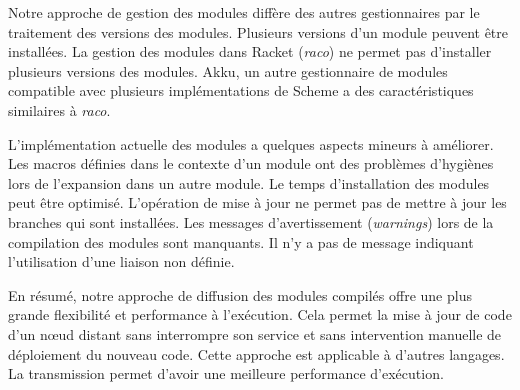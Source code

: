 Notre approche de gestion des modules diffère des autres gestionnaires par le
traitement des versions des modules. Plusieurs versions d'un module peuvent
être installées. La gestion des modules dans Racket (\textit{raco}) ne permet
pas d'installer plusieurs versions des modules. Akku, un autre gestionnaire de
modules compatible avec plusieurs implémentations de Scheme a des
caractéristiques similaires à \textit{raco}.

L'implémentation actuelle des modules a quelques aspects mineurs à améliorer.
Les macros définies dans le contexte d'un module ont des problèmes d'hygiènes
lors de l'expansion dans un autre module. Le temps d'installation des modules
peut être optimisé. L'opération de mise à jour ne permet pas de mettre à jour
les branches qui sont installées.  Les messages d'avertissement
(\textit{warnings}) lors de la compilation des modules sont manquants. Il n'y a
pas de message indiquant l'utilisation d'une liaison non définie.


En résumé, notre approche de diffusion des modules compilés offre une
plus grande flexibilité et performance à l'exécution. Cela permet la mise à jour de
code d'un nœud distant sans interrompre son service et sans intervention
manuelle de déploiement du nouveau code. Cette approche
est applicable à d'autres langages. La transmission permet d'avoir
une meilleure performance d'exécution.


